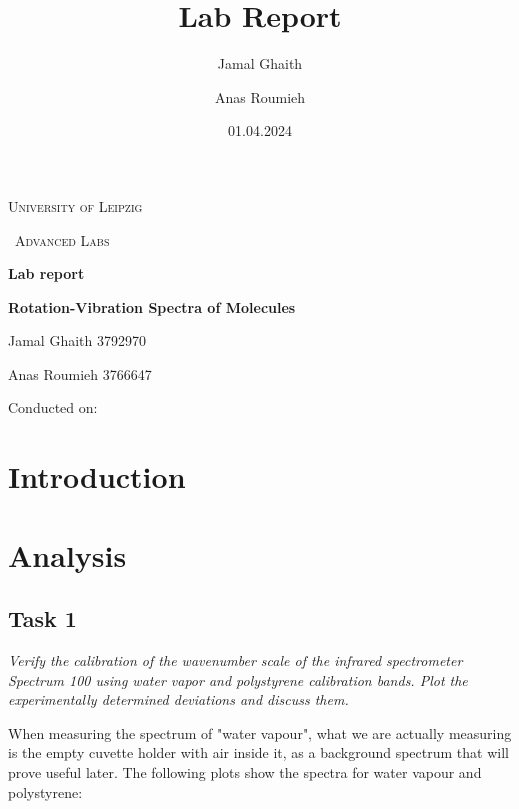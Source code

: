 \documentclass{article}
\title{Lab Report}
\author{Jamal Ghaith}
\author{Anas Roumieh}
\date{01.04.2024}
\begin{document}
\begin{titlepage}
	\centering
	{\scshape\LARGE University of Leipzig \par}
	\vspace{1cm}
	{\scshape\ Advanced Labs\par}
	\vspace{1.5cm}
	{\huge\bfseries Lab report\par}
	\vspace{2cm}
	{\huge\bfseries Rotation-Vibration Spectra of Molecules\par}
	\vspace{2cm}
	{\Large Jamal Ghaith 3792970\par}
    {\Large Anas Roumieh 3766647\par}
	\vfill

    {\Large Conducted on: \par}
	\vfill
\end{titlepage}


\tableofcontents
{}
\pagebreak{}

\section{Introduction}

\pagebreak{}

\section{Analysis}

\subsection{Task 1}

\textit{Verify the calibration of the wavenumber scale of the infrared spectrometer Spectrum 100 using
water vapor and polystyrene calibration bands. Plot the experimentally determined deviations and
discuss them.}

When measuring the spectrum of "water vapour", what we are actually measuring is the empty cuvette holder with air inside it, as a background spectrum that will prove useful later. The following plots show the spectra for water vapour and polystyrene:
\end{document}
